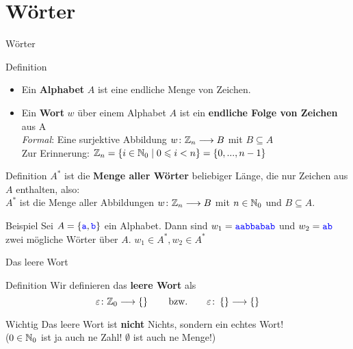 \section{Wörter}

\begin{frame}{Wörter}
	\begin{block}{Definition}
		\begin{itemize}
			\item Ein \textbf{Alphabet} $A$ ist eine endliche Menge von Zeichen. \pause
			\item Ein \textbf{Wort} $w$  über einem Alphabet $A$ ist ein \textbf{endliche Folge von Zeichen} aus A \\ \pause
				\emph{Formal}: Eine surjektive Abbildung $w \colon \mathbb{Z}_n \longrightarrow B$ mit $B \subseteq A$\\[0.5em]
				Zur Erinnerung: $ \mathbb{Z}_n = \{i \in \mathbb{N}_0 \mid 0 \leqslant i < n \} = \left\{0, ..., n-1\right\} $ 
		\end{itemize}
	\end{block}	
	
	\pause
	\begin{block}{Definition}
		$A^*$ ist die \textbf{Menge aller Wörter} beliebiger Länge, die nur Zeichen aus $A$ enthalten, also:\\
		\pause 
		$A^*$ ist die Menge aller Abbildungen $w \colon \mathbb{Z}_n \longrightarrow B$ mit $n \in \mathbb{N}_0$ und $B \subseteq A$. \\
	\end{block}

	\pause
	\begin{block}{Beispiel}
		Sei $ A = \{ \hbox{\textcolor{blue}{\texttt{a}}}, \hbox{\textcolor{blue}{\texttt{b}}} \} $ ein Alphabet. 
		Dann sind $ w_1 = \hbox{\textcolor{blue}{\texttt{aabbabab}}}$ und $w_2 = \hbox{\textcolor{blue}{\texttt{ab}}} $ zwei mögliche Wörter über $A$. 
		\impl $ w_1 \in A^*, w_2 \in A^*$
	\end{block}

\end{frame}

\begin{frame}[t]{Das leere Wort}
	\begin{block}{Definition}
		Wir definieren das \textbf{leere Wort} als $$ \varepsilon \colon \mathbb{Z}_0  \longrightarrow \left\{\right\} \qquad\text{bzw.}\qquad \varepsilon \colon \left\{\right\} \longrightarrow \left\{\right\} $$ \pause

	\end{block}
	
	\begin{block}{Wichtig}
		Das leere Wort ist \textbf{nicht} Nichts, sondern ein echtes Wort! \\
		($0 \in \mathbb{N}_0$ ist ja auch ne Zahl! $\emptyset$ ist auch ne Menge!)
	\end{block}
		
	
\end{frame}



